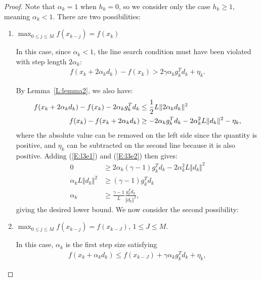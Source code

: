 \documentclass[10pt,a4paper]{amsart}
\begin{document}
\begin{proof} Note that $\alpha_k = 1$ when $h_k = 0$, so we consider only the case $h_k \geq 1$, meaning $\alpha_k < 1$. There are two possibilities:
\begin{enumerate}
\item $\displaystyle \max_{0 \leq j \leq M} f(x_{k-j}) = f(x_k)$

In this case, since $\alpha_k < 1$, the line search condition must have been violated with step length $2 \alpha_k$:
\begin{align}
f(x_k + 2 \alpha_k d_k) - f(x_{k}) > 2\gamma \alpha_k g_k^T d_k + \eta_k.\label{E:l3e1}
\end{align}

By Lemma~\ref{L:lemma2}, we also have:
\begin{align}
f(x_k + 2 \alpha_k d_k) - f(x_{k}) -2  \alpha_k g_k^T d_k &\leq \frac{1}{2} L \Vert 2 \alpha_k d_k \Vert^2 \notag\\
f(x_{k}) - f(x_k + 2 \alpha_k d_k)  &\geq -2  \alpha_k g_k^T d_k - 2 \alpha_k^2 L \Vert d_k \Vert^2 -\eta_k,\label{E:l3e2}
\end{align}
where the absolute value can be removed on the left side since the quantity is positive, and $\eta_k$ can be subtracted on the second line because it is also positive. Adding (\ref{E:l3e1}) and (\ref{E:l3e2}) then gives:
\begin{align*}
0 &\geq 2\alpha_k (\gamma - 1)g_k^T d_k - 2 \alpha_k^2 L\Vert d_k \Vert ^2   \\
\alpha_k L\Vert d_k \Vert ^2 &\geq (\gamma - 1) g_k^T d_k \\
\alpha_k &\geq \frac{\gamma-1}{L} \frac{g_k^T d_k}{\Vert d_k \Vert^2},
\end{align*}
giving the desired lower bound. We now consider the second possibility:
\item  $\displaystyle \max_{0 \leq j \leq M} f(x_{k-j}) = f(x_{k-J})$, $1 \leq J \leq M$.

In this case, $\alpha_k$ is the first step size satisfying 
\begin{align*}
f(x_k + \alpha_k d_k ) \leq  f(x_{k-J}) + \gamma \alpha_k g_k^T d_k + \eta_k,
\end{align*}


\end{enumerate}
\end{proof}
\end{document}
